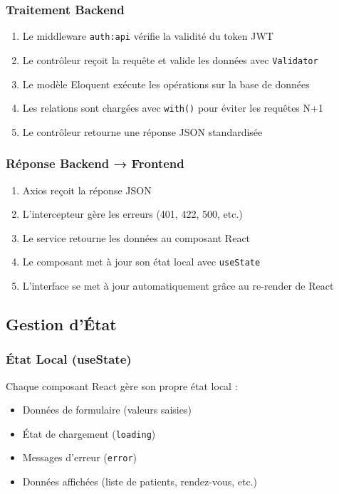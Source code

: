 \documentclass[12pt,a4paper]{report}
\begin{document}
\subsubsection{Traitement Backend}

\begin{enumerate}
    \item Le middleware \texttt{auth:api} vérifie la validité du token JWT
    \item Le contrôleur reçoit la requête et valide les données avec \texttt{Validator}
    \item Le modèle Eloquent exécute les opérations sur la base de données
    \item Les relations sont chargées avec \texttt{with()} pour éviter les requêtes N+1
    \item Le contrôleur retourne une réponse JSON standardisée
\end{enumerate}

\subsubsection{Réponse Backend → Frontend}

\begin{enumerate}
    \item Axios reçoit la réponse JSON
    \item L'intercepteur gère les erreurs (401, 422, 500, etc.)
    \item Le service retourne les données au composant React
    \item Le composant met à jour son état local avec \texttt{useState}
    \item L'interface se met à jour automatiquement grâce au re-render de React
\end{enumerate}

\subsection{Gestion d'État}

\subsubsection{État Local (useState)}

Chaque composant React gère son propre état local :
\begin{itemize}
    \item Données de formulaire (valeurs saisies)
    \item État de chargement (\texttt{loading})
    \item Messages d'erreur (\texttt{error})
    \item Données affichées (liste de patients, rendez-vous, etc.)
\end{itemize}
\end{document}
